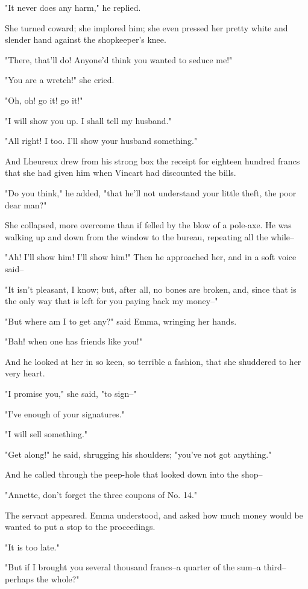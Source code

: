 \documentclass[11pt,twocolumn]{ltugboat}
\begin{document}
"It never does any harm," he replied.

She turned coward; she implored him; she even pressed her pretty white
and slender hand against the shopkeeper's knee.

"There, that'll do! Anyone'd think you wanted to seduce me!"

"You are a wretch!" she cried.

"Oh, oh! go it! go it!"

"I will show you up. I shall tell my husband."

"All right! I too. I'll show your husband something."

And Lheureux drew from his strong box the receipt for eighteen hundred
francs that she had given him when Vincart had discounted the bills.

"Do you think," he added, "that he'll not understand your little theft,
the poor dear man?"

She collapsed, more overcome than if felled by the blow of a pole-axe.
He was walking up and down from the window to the bureau, repeating all
the while--

"Ah! I'll show him! I'll show him!" Then he approached her, and in a
soft voice said--

"It isn't pleasant, I know; but, after all, no bones are broken, and,
since that is the only way that is left for you paying back my money--"

"But where am I to get any?" said Emma, wringing her hands.

"Bah! when one has friends like you!"

And he looked at her in so keen, so terrible a fashion, that she
shuddered to her very heart.

"I promise you," she said, "to sign--"

"I've enough of your signatures."

"I will sell something."

"Get along!" he said, shrugging his shoulders; "you've not got
anything."

And he called through the peep-hole that looked down into the shop--

"Annette, don't forget the three coupons of No. 14."

The servant appeared. Emma understood, and asked how much money would be
wanted to put a stop to the proceedings.

"It is too late."

"But if I brought you several thousand francs--a quarter of the sum--a
third--perhaps the whole?"
\end{document}
